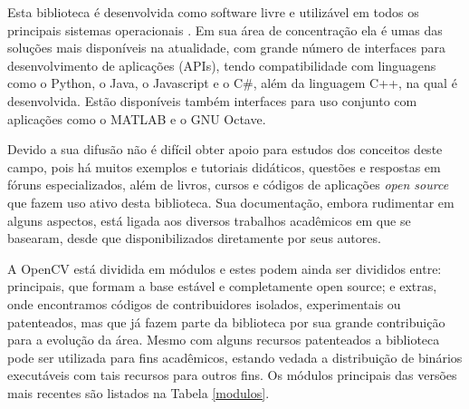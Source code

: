Esta biblioteca é desenvolvida como software livre e utilizável em todos os principais sistemas operacionais \cite{OpenCV}. Em sua área de concentração ela é umas das soluções mais disponíveis na atualidade, com grande número de interfaces para desenvolvimento de aplicações (APIs), tendo compatibilidade com linguagens como o Python, o Java, o Javascript e o C\#, além da linguagem C++, na qual é desenvolvida. Estão disponíveis também interfaces para uso conjunto com aplicações como o MATLAB e o GNU Octave. 

Devido a sua difusão não é difícil obter apoio para estudos dos conceitos deste campo, pois há muitos exemplos e tutoriais didáticos, questões e respostas em fóruns especializados, além de livros, cursos e códigos de aplicações \textit{open source} que fazem uso ativo desta biblioteca. Sua documentação, embora rudimentar em alguns aspectos, está ligada aos diversos trabalhos acadêmicos em que se basearam, desde que disponibilizados diretamente por seus autores.

A OpenCV está dividida em módulos e estes podem ainda ser divididos entre: principais, que formam a base estável e completamente open source; e extras, onde encontramos códigos de contribuidores isolados, experimentais ou patenteados, mas que já fazem parte da biblioteca por sua grande contribuição para a evolução da área. Mesmo com alguns recursos patenteados a biblioteca pode ser utilizada para fins acadêmicos, estando vedada a distribuição de binários executáveis com tais recursos para outros fins. Os módulos principais das versões mais recentes são listados na Tabela \ref{modulos}.

